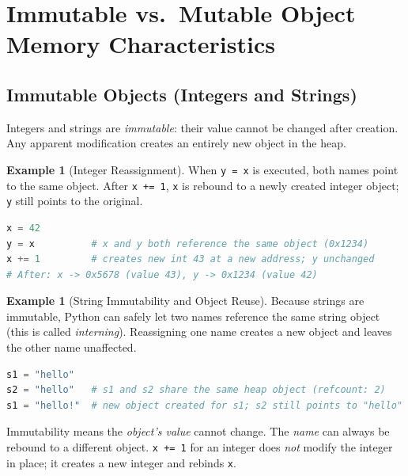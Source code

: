 \documentclass[11pt, a4paper, notitlepage]{report}
\theoremstyle{definition}
\theoremstyle{remark}
\theoremstyle{definition}
\newtheorem{example}[theorem]{Example}
\begin{document}
\section{Immutable vs.\ Mutable Object Memory Characteristics}
\label{sec:mut-immut}

\subsection{Immutable Objects (Integers and Strings)}
\label{subsec:immutable}

Integers and strings are \emph{immutable}: their value cannot be changed after creation.
Any apparent modification creates an entirely new object in the heap.

\begin{example}[Integer Reassignment]
When \texttt{y = x} is executed, both names point to the same object. After \texttt{x += 1},
\texttt{x} is rebound to a newly created integer object; \texttt{y} still points to the
original.
\begin{lstlisting}[language=Python]
x = 42
y = x          # x and y both reference the same object (0x1234)
x += 1         # creates new int 43 at a new address; y unchanged
# After: x -> 0x5678 (value 43), y -> 0x1234 (value 42)
\end{lstlisting}
\end{example}

\begin{example}[String Immutability and Object Reuse]
Because strings are immutable, Python can safely let two names reference the same string
object (this is called \emph{interning}). Reassigning one name creates a new object and
leaves the other name unaffected.
\begin{lstlisting}[language=Python]
s1 = "hello"
s2 = "hello"   # s1 and s2 share the same heap object (refcount: 2)
s1 = "hello!"  # new object created for s1; s2 still points to "hello"
\end{lstlisting}
\end{example}

\begin{warning}[title={Warning: Immutability Does Not Mean Unrebindable}]
Immutability means the \emph{object's value} cannot change. The \emph{name} can always be
rebound to a different object. \texttt{x += 1} for an integer does \emph{not} modify the
integer in place; it creates a new integer and rebinds \texttt{x}.
\end{warning}
\end{document}
